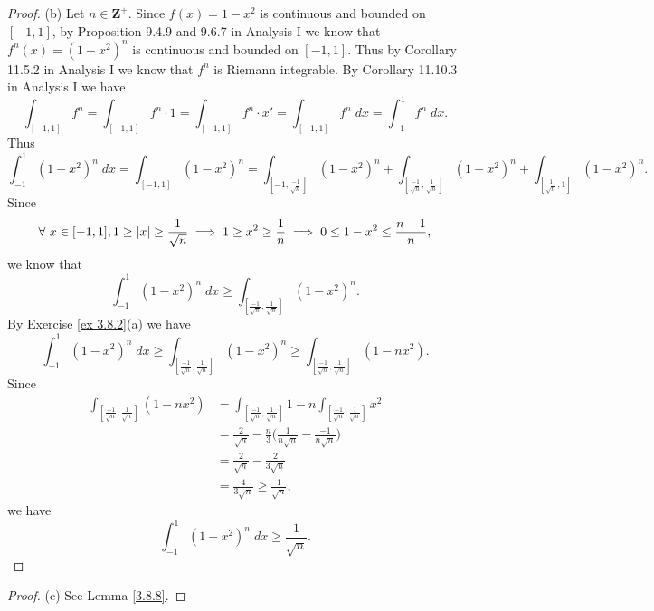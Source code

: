 \begin{proof}{(b)}
    Let \(n \in \mathbf{Z}^+\).
    Since \(f(x) = 1 - x^2\) is continuous and bounded on \([-1, 1]\), by Proposition 9.4.9 and 9.6.7 in Analysis I we know that \(f^n(x) = (1 - x^2)^n\) is continuous and bounded on \([-1, 1]\).
    Thus by Corollary 11.5.2 in Analysis I we know that \(f^n\) is Riemann integrable.
    By Corollary 11.10.3 in Analysis I we have
    \[
        \int_{[-1, 1]} f^n = \int_{[-1, 1]} f^n \cdot 1 = \int_{[-1, 1]} f^n \cdot x' = \int_{[-1, 1]} f^n \; dx = \int_{-1}^1 f^n \; dx.
    \]
    Thus
    \[
        \int_{-1}^1 (1 - x^2)^n \; dx = \int_{[-1, 1]} (1 - x^2)^n = \int_{[-1, \frac{-1}{\sqrt{n}}]} (1 - x^2)^n + \int_{[\frac{-1}{\sqrt{n}}, \frac{1}{\sqrt{n}}]} (1 - x^2)^n + \int_{[\frac{1}{\sqrt{n}}, 1]} (1 - x^2)^n.
    \]
    Since
    \[
        \forall\ x \in [-1, 1], 1 \geq \abs*{x} \geq \frac{1}{\sqrt{n}} \implies 1 \geq x^2 \geq \frac{1}{n} \implies 0 \leq 1 - x^2 \leq \frac{n - 1}{n},
    \]
    we know that
    \[
        \int_{-1}^1 (1 - x^2)^n \; dx \geq \int_{[\frac{-1}{\sqrt{n}}, \frac{1}{\sqrt{n}}]} (1 - x^2)^n.
    \]
    By Exercise \ref{ex 3.8.2}(a) we have
    \[
        \int_{-1}^1 (1 - x^2)^n \; dx \geq \int_{[\frac{-1}{\sqrt{n}}, \frac{1}{\sqrt{n}}]} (1 - x^2)^n \geq \int_{[\frac{-1}{\sqrt{n}}, \frac{1}{\sqrt{n}}]} (1 - n x^2).
    \]
    Since
    \begin{align*}
        \int_{[\frac{-1}{\sqrt{n}}, \frac{1}{\sqrt{n}}]} (1 - n x^2) & = \int_{[\frac{-1}{\sqrt{n}}, \frac{1}{\sqrt{n}}]} 1 - n \int_{[\frac{-1}{\sqrt{n}}, \frac{1}{\sqrt{n}}]} x^2 \\
                                                                     & = \frac{2}{\sqrt{n}} - \frac{n}{3} \bigg(\frac{1}{n \sqrt{n}} - \frac{-1}{n \sqrt{n}}\bigg)                   \\
                                                                     & = \frac{2}{\sqrt{n}} - \frac{2}{3 \sqrt{n}}                                                                   \\
                                                                     & = \frac{4}{3 \sqrt{n}} \geq \frac{1}{\sqrt{n}},
    \end{align*}
    we have
    \[
        \int_{-1}^1 (1 - x^2)^n \; dx \geq \frac{1}{\sqrt{n}}.
    \]
\end{proof}

\begin{proof}{(c)}
    See Lemma \ref{3.8.8}.
\end{proof}

